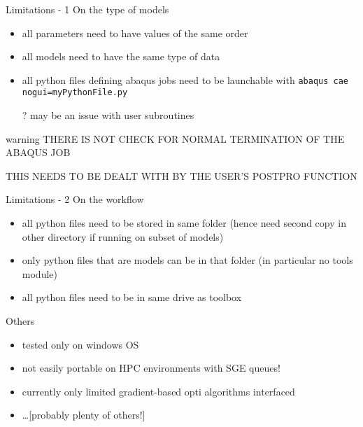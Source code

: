 \begin{frame}{Limitations - 1}
On the type of models
\begin{itemize}
\item all parameters need to have values of the same order
\item all models need to have the same type of data
\item all python files defining abaqus jobs need to be launchable with
  \texttt{abaqus cae nogui=myPythonFile.py}
  
  ? may be an issue with user subroutines
\end{itemize}
\begin{block}{warning}
THERE IS NOT CHECK FOR NORMAL TERMINATION OF THE ABAQUS JOB

THIS NEEDS TO BE DEALT WITH BY THE USER'S POSTPRO FUNCTION
\end{block}

\end{frame}


\begin{frame}{Limitations - 2}
On the workflow
\begin{itemize}
\item all python files need to be stored in same folder (hence need second copy in other directory if running on subset of models)
\item only python files that are models can be in that folder (in particular no tools module) \item all python files need to be in same drive as toolbox
\end{itemize}
Others
\begin{itemize}
\item tested only on windows OS
\item not easily portable on HPC environments with SGE queues!
\item currently only limited gradient-based opti algorithms interfaced
\item \dots [probably plenty of others!]
\end{itemize}
\end{frame}
